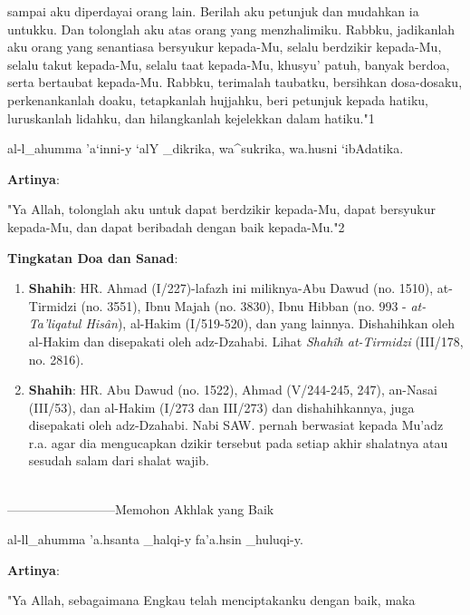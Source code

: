 \documentclass[a4paper,12pt]{article}
\begin{document}
sampai aku diperdayai orang lain. Berilah aku petunjuk dan mudahkan ia 
untukku. Dan tolonglah aku atas orang yang menzhalimiku. Rabbku, jadikanlah
aku orang yang senantiasa bersyukur kepada-Mu, selalu berdzikir kepada-Mu, 
selalu takut kepada-Mu, selalu taat kepada-Mu, khusyu' patuh, banyak 
berdoa, serta bertaubat kepada-Mu. Rabbku, terimalah taubatku, bersihkan 
dosa-dosaku, perkenankanlah doaku, tetapkanlah hujjahku, beri petunjuk 
kepada hatiku, luruskanlah lidahku, dan hilangkanlah kejelekkan dalam 
hatiku."{\scriptsize 1}\\
\begin{arabtext}
\noindent
al-l_ahumma 'a`inni-y `alY _dikrika, wa^sukrika, wa.husni `ibAdatika.\\
\end{arabtext}
\noindent
\textbf{Artinya}:
\par
\indent
"Ya Allah, tolonglah aku untuk dapat berdzikir kepada-Mu, dapat bersyukur 
kepada-Mu, dan dapat beribadah dengan baik kepada-Mu."{\scriptsize 2}\\
\par
\noindent
\textbf{Tingkatan Doa dan Sanad}:
\begin{enumerate}
\item \textbf{Shahih}: HR. Ahmad (I/227)-lafazh ini miliknya-Abu Dawud (no. 
1510), at-Tirmidzi (no. 3551), Ibnu Majah (no. 3830), Ibnu Hibban (no. 993 
- \textit{at-Ta'liqatul His\^{a}n}), al-Hakim (I/519-520), dan yang 
lainnya. Dishahihkan oleh al-Hakim dan disepakati oleh adz-Dzahabi. Lihat 
\textit{Shah\^{i}h at-Tirmidzi} (III/178, no. 2816).
\item \textbf{Shahih}: HR. Abu Dawud (no. 1522), Ahmad (V/244-245, 247), 
an-Nasai (III/53), dan al-Hakim (I/273 dan III/273) dan dishahihkannya, 
juga disepakati oleh adz-Dzahabi. Nabi SAW. pernah berwasiat kepada Mu'adz 
r.a. agar dia mengucapkan dzikir tersebut pada setiap akhir shalatnya atau 
sesudah salam dari shalat wajib.\\\\
\end{enumerate}
\par
{}--------------------------Memohon Akhlak yang Baik
\begin{arabtext}
\noindent
al-ll_ahumma 'a.hsanta _halqi-y fa'a.hsin _huluqi-y.\\
\end{arabtext}
\noindent
\textbf{Artinya}:
\par
\indent
"Ya Allah, sebagaimana Engkau  telah menciptakanku dengan baik, maka 
\end{document}
